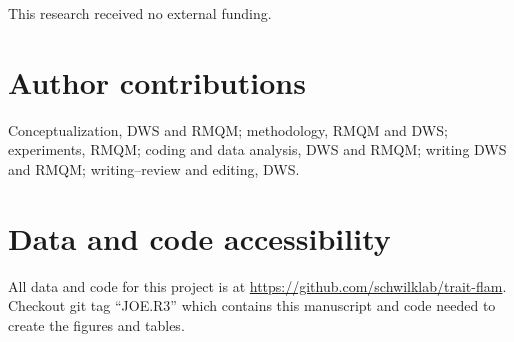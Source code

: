 \documentclass[letterpaper,12pt]{article}
\begin{document}
This research received no external funding.

\section*{Author contributions}

Conceptualization, DWS and RMQM; methodology, RMQM and DWS; experiments, RMQM;
coding and data analysis, DWS and RMQM; writing DWS and RMQM; writing--review
and editing, DWS.

\section*{Data and code accessibility}
All data and code for this project is at
\url{https://github.com/schwilklab/trait-flam}. Checkout git tag ``JOE.R3''
which contains this manuscript and code needed to create the figures and
tables.

\newpage




\end{document}
